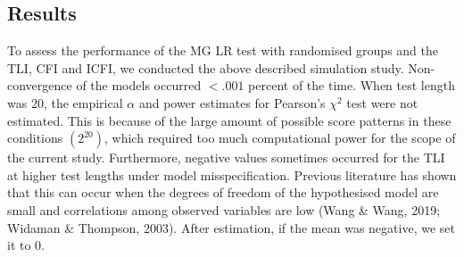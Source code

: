 \documentclass[Royal,sageapa,times,doublespace]{sagej}
\begin{document}
\subsection{Results}

To assess the performance of the MG LR test with randomised groups and the TLI, CFI and ICFI, we conducted the above described simulation study. Non-convergence of the models occurred $<.001$ percent of the time. When test length was $20$, the empirical $\alpha$ and power estimates for Pearson's $\chi^2$ test were not estimated. This is because of the large amount of possible score patterns in these conditions $(2^{20})$, which required too much computational power for the scope of the current study. Furthermore, negative values sometimes occurred for the TLI at higher test lengths under model misspecification. Previous literature has shown that this can occur when the degrees of freedom of the hypothesised model are small and correlations among observed variables are low (Wang \& Wang, 2019; Widaman \& Thompson, 2003). After estimation, if the mean was negative, we set it to $0$.\\
\end{document}
